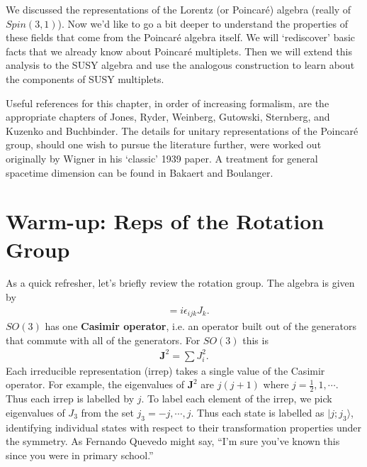 \documentclass[12pt, oneside]{report}    %
\let\oldsection\section
\def\section{%
  \setcounter{sidenote}{1}%
  \oldsection
}
\begin{document}
We discussed the representations of the Lorentz (or Poincar\'e) algebra (really of $Spin(3,1)$). Now we'd like to go a bit deeper to understand the properties of these fields that come from the Poincar\'e algebra itself. We will `rediscover' basic facts that we already know about Poincar\'e multiplets. Then we will extend this analysis to the SUSY algebra and use the analogous construction to learn about the components of SUSY multiplets.

Useful references for this chapter, in order of increasing formalism, are the appropriate chapters of Jones\autocite{JonesGroups}, Ryder\autocite{Ryder:1996}, Weinberg\autocite{weinberg}, Gutowski\autocite{gutowski}, Sternberg\autocite{Sternberg:1994tw}, and Kuzenko and Buchbinder\autocite{Buchbinder:1998qv}. The details for unitary representations of the Poincar\'e group, should one wish to pursue the literature further, were worked out originally by Wigner in his `classic' 1939 paper\autocite{Wigner:1939cj}. A treatment for general spacetime dimension can be found in Bakaert and Boulanger\autocite{Bekaert:fk}.



\section{Warm-up: Reps of the Rotation Group}



As a quick refresher, let's briefly review the rotation group. The algebra is given by
\begin{align}
    [J_i,J_j]&=i\epsilon_{ijk}J_k.
\end{align}
$SO(3)$ has one \textbf{Casimir operator}, i.e. an operator built out of the generators that commute with all of the generators. For $SO(3)$ this is 
\begin{align}
    \mathbf{J}^2 = \sum J_i^2.
\end{align}
Each irreducible representation (irrep) takes a single value of the Casimir operator. For example, the eigenvalues of $\mathbf{J}^2$ are $j(j+1)$ where $j=\frac 12,1, \cdots$. Thus each irrep is labelled by $j$. To label each element of the irrep, we pick eigenvalues of $J_3$ from the set $j_3 = -j,\cdots,j$. Thus each state is labelled as $|j;j_3\rangle$, identifying individual states with respect to their transformation properties under the symmetry. As Fernando Quevedo might say, ``I'm sure you've known this since you were in primary school.''
\end{document}
